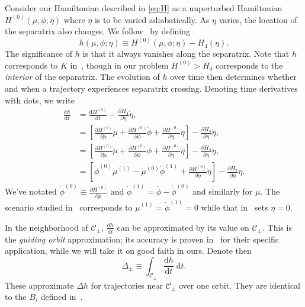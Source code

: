 \documentclass[
        fleqn,
        usenatbib,
    ]{mnras}
\newcommand*{\rd}[2]{\frac{\mathrm{d}#1}{\mathrm{d}#2}}
\newcommand*{\pd}[2]{\frac{\partial#1}{\partial#2}}
\newcommand*{\s}[1]{\left[#1\right]}
\begin{document}
Consider our Hamiltonian described in \autoref{eq:H} as a unperturbed
Hamiltonian $H^{(0)}(\mu, \phi; \eta)$ where $\eta$ is to be varied
adiabatically. As $\eta$ varies, the location of the separatrix also changes. We
follow~\cite{henrard1982} by defining
\begin{equation}
    h(\mu, \phi; \eta) \equiv H^{(0)}(\mu, \phi; \eta) - H_4(\eta).
\end{equation}
The significance of $h$ is that it always vanishes along the separatrix. Note
that $h$ corresponds to $K$ in~\cite{henrard1982}, though in our problem
$H^{(0)} > H_4$ corresponds to the \emph{interior} of the separatrix. The
evolution of $h$ over time then determines whether and when a trajectory
experiences separatrix crossing. Denoting time derivatives with dots, we write
\begin{align}
    \rd{h}{t} &= \rd{H^{(0)}}{t} - \pd{H_4}{\eta}\dot{\eta},\nonumber\\
        &= \s{\pd{H^{(0)}}{\mu}\dot{\mu}
                + \pd{H^{(0)}}{\phi}\dot{\phi}
                + \pd{H^{(0)}}{\eta}\dot{\eta}}
            - \pd{H_4}{\eta}\dot{\eta},\nonumber\\
        &= \s{\pd{H^{(0)}}{\mu}\dot{\mu}
                + \pd{H^{(0)}}{\phi}\dot{\phi}
                + \pd{H^{(0)}}{\eta}\dot{\eta}}
            - \pd{H_4}{\eta}\dot{\eta},\nonumber\\
        &= \s{\dot{\phi}^{(0)}\dot{\mu}^{(1)}
                - \dot{\mu}^{(0)}\dot{\phi}^{(1)}
                + \pd{H^{(0)}}{\eta}\dot{\eta}} -
            \pd{H_4}{\eta}\dot{\eta}.\label{eq:dhdt}
\end{align}
We've notated $\dot{\phi}^{(0)} \equiv \pd{H^{(0)}}{\mu}$ and $\dot{\phi}^{(1)}
= \dot{\phi} - \dot{\phi}^{(0)}$ and similarly for $\mu$. The scenario studied
in~\cite{henrard1982} corresponds to $\dot{\mu}^{(1)} = \dot{\phi}^{(1)} = 0$
while that in~\cite{g_and_h} sets $\dot{\eta} = 0$.

In the neighborhood of $\mathcal{C}_{\pm}$, $\rd{h}{t}$ can be
approximated by its value on $\mathcal{C}_{\pm}$. This is the \emph{guiding
orbit} approximation; its accuracy is proven in~\cite{henrard1982} for their
specific application, while we will take it on good faith in ours. Denote then
\begin{equation}
    \Delta_{\pm} \equiv \int_{\mathcal{C}_{\pm}} \rd{h}{t}\;\mathrm{d}t.
        \label{eq:delta}
\end{equation}
These approximate $\Delta h$ for trajectories near $\mathcal{C}_{\pm}$ over one
orbit. They are identical to the $B_i$ defined in~\cite{henrard1982}.
\end{document}
